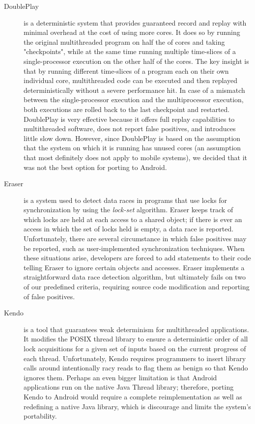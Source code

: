 \documentclass{acm_proc_article-sp}
\begin{document}
\begin{description}
\item[DoublePlay] \cite{Veeraraghavan2012} is a deterministic system that provides guaranteed record and replay with minimal overhead at the cost of using more cores.  It does so by running the original multithreaded program on half the of cores and taking "checkpoints", while at the same time running multiple time-slices of a single-processor execution on the other half of the cores. The key insight is that by running different time-slices of a program each on their own individual core, multithreaded code can be executed and then replayed deterministically without a severe performance hit. In case of a mismatch between the single-processor execution and the multiprocessor execution, both executions are rolled back to the last checkpoint and restarted. DoublePlay is very effective because it offers full replay capabilities to multithreaded software, does not report false positives, and introduces little slow down. However, since DoublePlay is based on the assumption that the system on which it is running has unused cores (an assumption that most definitely does not apply to mobile systems), we decided that it was not the best option for porting to Android. 

\item[Eraser] \cite{Savage1997} is a system used to detect data races in programs that use locks for synchronization by using the \emph{lock-set} algorithm. Eraser keeps track of which locks are held at each access to a shared object; if there is ever an access in which the set of locks held is empty, a data race is reported. Unfortunately, there are several circumstance in which false positives may be reported, such as user-implemented synchronization techniques. When these situations arise, developers are forced to add statements to their code telling Eraser to ignore certain objects and accesses. Eraser implements a straightforward data race detection algorithm, but ultimately fails on two of our predefined criteria, requiring source code modification and reporting of false positives.


\item[Kendo]  \cite{Olszewski2009} is a tool that guarantees weak determinism for multithreaded applications. It modifies the POSIX thread library to ensure a deterministic order of all lock acquisitions for a given set of inputs based on the current progress of each thread. Unfortunately, Kendo requires programmers to insert library calls around intentionally racy reads to flag them as benign so that Kendo ignores them. Perhaps an even bigger limitation is that Android applications run on the native Java Thread library; therefore, porting Kendo to Android would require a complete reimplementation as well as redefining a native Java library, which is discourage and limits the system's portability.



\end{description}
\end{document}
